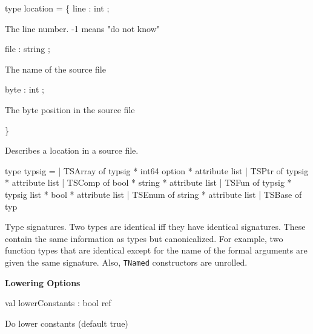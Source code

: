 \documentclass[11pt]{article}
\begin{document}
\label{type:Cil.location}\begin{ocamldoccode}
type location = \{
  line : int ;
\end{ocamldoccode}
\begin{ocamldoccomment}
The line number. -1 means "do not know"
\end{ocamldoccomment}
\begin{ocamldoccode}
  file : string ;
\end{ocamldoccode}
\begin{ocamldoccomment}
The name of the source file
\end{ocamldoccomment}
\begin{ocamldoccode}
  byte : int ;
\end{ocamldoccode}
\begin{ocamldoccomment}
The byte position in the source file
\end{ocamldoccomment}
\begin{ocamldoccode}
\}
\end{ocamldoccode}
\begin{ocamldocdescription}
Describes a location in a source file.


\end{ocamldocdescription}




\label{type:Cil.typsig}\begin{ocamldoccode}
type typsig =
  | TSArray of typsig * int64 option * attribute list
  | TSPtr of typsig * attribute list
  | TSComp of bool * string * attribute list
  | TSFun of typsig * typsig list * bool * attribute list
  | TSEnum of string * attribute list
  | TSBase of typ
\end{ocamldoccode}
\begin{ocamldocdescription}
Type signatures. Two types are identical iff they have identical 
 signatures. These contain the same information as types but canonicalized. 
 For example, two function types that are identical except for the name of 
 the formal arguments are given the same signature. Also, {\tt{TNamed}} 
 constructors are unrolled.


\end{ocamldocdescription}




{\bf Lowering Options}



\label{val:Cil.lowerConstants}\begin{ocamldoccode}
val lowerConstants : bool ref
\end{ocamldoccode}
\begin{ocamldocdescription}
Do lower constants (default true)


\end{ocamldocdescription}
\end{document}
